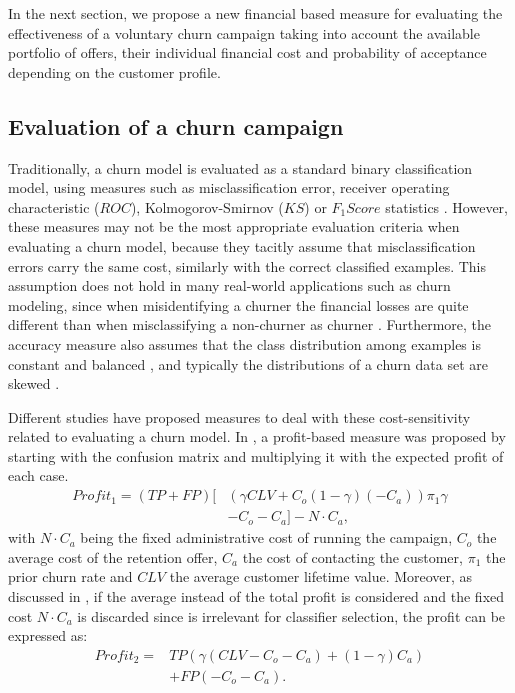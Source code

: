 In the next section, we propose a new financial based measure for evaluating the effectiveness of 
a voluntary churn campaign taking into account the available portfolio of offers, their 
individual 	financial cost and probability of acceptance depending on the customer profile. 


\subsection{Evaluation of a churn campaign}
\label{sec:5:1:evaluation}
	
Traditionally, a churn model is evaluated as a standard binary classification model, 
using measures such as misclassification error, receiver operating characteristic ($ROC$),  
Kolmogorov-Smirnov ($KS$) or \mbox{$F_1Score$} statistics \citep{Verbeke2012}.
However, these measures may not be the most appropriate evaluation criteria when  
evaluating a churn model, because they tacitly assume that misclassification errors carry the 
same cost, similarly with the correct classified examples. This assumption does not hold in many 
real-world applications such as churn modeling, since  when misidentifying a churner the financial 
losses are quite different than when misclassifying a non-churner as churner \citep{Glady2009}. 
Furthermore, the accuracy measure also assumes that the class distribution 
among examples is constant and balanced \citep{Provost1998}, and typically the distributions of a 
churn data set are skewed \citep{Verbeke2012}.

Different studies have proposed measures to deal with these cost-sensitivity related to
evaluating a churn model. In \citep{Neslin2006}, a profit-based measure was proposed by starting 
with the confusion matrix and multiplying it with the expected profit of each case.
\newpage
\begin{align}\label{eq:5:profit1}
 Profit_1 = (TP+FP)\bigg[ & \left(\gamma CLV + C_o(1-\gamma)(-C_a)\right)\pi_1\gamma \nonumber \\
 & -C_o-C_a\bigg]-N\cdot C_a,
\end{align}
with $N\cdot C_a$ being the fixed administrative cost of running the campaign, $C_o$ the average 
cost of the retention offer, $C_a$ the cost of contacting the customer, $\pi_1$ the prior churn rate 
and $CLV$ the average customer lifetime value.
Moreover, as discussed in \citep{Verbraken2013}, if the average instead of the total profit is 
considered and the fixed cost $N\cdot C_a$ is discarded since is irrelevant for classifier 
selection, the profit can be expressed as:
\begin{align}\label{eq:5:profit2}
 Profit_2 = &TP\left(\gamma(CLV-C_o-C_a)+(1-\gamma)C_a \right) \nonumber \\
 &+FP(-C_o-C_a).
\end{align}

